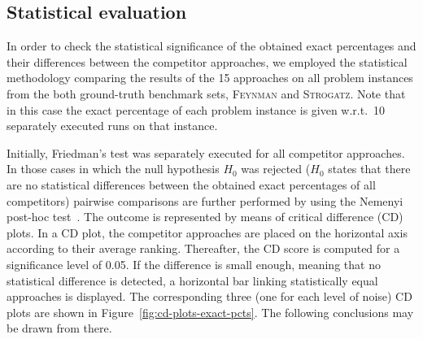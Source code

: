 \documentclass[a4paper,12pt]{elsarticle}
\begin{document}
\subsection{Statistical evaluation}

In order to check the statistical significance of the obtained exact percentages and their differences between the competitor approaches, we employed the statistical methodology comparing the results of  the 15 approaches on all problem instances from the both ground-truth benchmark sets, \textsc{Feynman} and \textsc{Strogatz}. Note that in this case the exact percentage of each problem instance is given w.r.t.\  10 separately executed runs on that instance. 

Initially, Friedman’s test was separately executed for all competitor approaches.      In those cases in which the null hypothesis $H_0$ was rejected ($H_0$ states that there are no statistical differences between the obtained exact percentages of all competitors) pairwise comparisons are further performed by using the Nemenyi post-hoc test~\cite{pohlert2014pairwise}. The outcome is represented by means of critical difference (CD) plots. In a CD plot, the competitor approaches are placed on the horizontal axis according to their average ranking. Thereafter, the CD score is computed for a significance level of 0.05. If the difference is small enough, meaning that no statistical difference is detected, a horizontal bar linking statistically equal approaches is displayed.   The corresponding three (one for each level of noise) CD plots are shown in Figure~\ref{fig:cd-plots-exact-pcts}. The following conclusions may be drawn from there.
\end{document}
